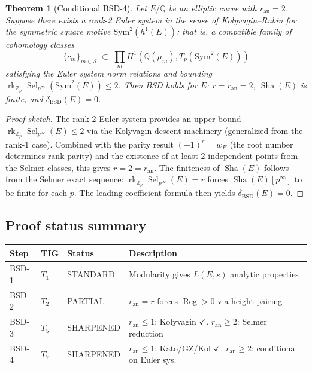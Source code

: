 \documentclass[11pt]{article}
\newtheorem{theorem}{Theorem}[section]
\DeclareMathOperator{\rk}{rk}
\DeclareMathOperator{\Reg}{Reg}
\DeclareMathOperator{\Sha}{Sha}
\DeclareMathOperator{\Sel}{Sel}
\begin{document}
\begin{theorem}[Conditional BSD-4]
\label{thm:conditional-bsd4}
Let $E/\mathbb{Q}$ be an elliptic curve with $r_{\mathrm{an}} = 2$.  Suppose
there exists a rank-2 Euler system in the sense of Kolyvagin--Rubin for the
symmetric square motive $\mathrm{Sym}^2(h^1(E))$: that is, a compatible
family of cohomology classes
\[
  \{c_m\}_{m \in \mathcal{S}} \;\subset\;
  \prod_{m} H^1(\mathbb{Q}(\mu_m), T_p(\mathrm{Sym}^2(E)))
\]
satisfying the Euler system norm relations and bounding
$\rk_{\mathbb{Z}_p} \Sel_{p^\infty}(\mathrm{Sym}^2(E)) \leq 2$.  Then BSD
holds for $E$: $r = r_{\mathrm{an}} = 2$, $\Sha(E)$ is finite, and
$\delta_{\mathrm{BSD}}(E) = 0$.
\end{theorem}

\begin{proof}[Proof sketch]
The rank-2 Euler system provides an upper bound
$\rk_{\mathbb{Z}_p} \Sel_{p^\infty}(E) \leq 2$ via the Kolyvagin descent
machinery (generalized from the rank-1 case).  Combined with the parity
result $(-1)^r = w_E$ (the root number determines rank parity) and the
existence of at least 2 independent points from the Selmer classes, this gives
$r = 2 = r_{\mathrm{an}}$.  The finiteness of $\Sha(E)$ follows from the
Selmer exact sequence: $\rk_{\mathbb{Z}_p} \Sel_{p^\infty}(E) = r$ forces
$\Sha(E)[p^\infty]$ to be finite for each $p$.  The leading coefficient
formula then yields $\delta_{\mathrm{BSD}}(E) = 0$.
\end{proof}

\subsection{Proof status summary}

\begin{center}
\begin{tabular}{lllp{5.5cm}}
\hline
\textbf{Step} & \textbf{TIG} & \textbf{Status} & \textbf{Description} \\
\hline
BSD-1 & $T_1$ & STANDARD & Modularity gives $L(E,s)$ analytic properties \\
BSD-2 & $T_2$ & PARTIAL  & $r_{\mathrm{an}} = r$ forces $\Reg > 0$ via height pairing \\
BSD-3 & $T_5$ & SHARPENED & $r_{\mathrm{an}} \leq 1$: Kolyvagin $\checkmark$. $r_{\mathrm{an}} \geq 2$: Selmer reduction \\
BSD-4 & $T_7$ & SHARPENED & $r_{\mathrm{an}} \leq 1$: Kato/GZ/Kol $\checkmark$. $r_{\mathrm{an}} \geq 2$: conditional on Euler sys. \\
\hline
\end{tabular}
\end{center}
\end{document}
